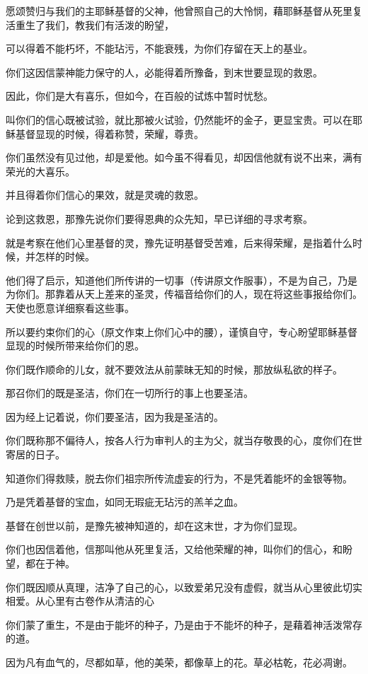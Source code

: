 \documentclass[12pt,oneside]{book}
\begin{document}
愿颂赞归与我们的主耶稣基督的父神，他曾照自己的大怜悯，藉耶稣基督从死里复活重生了我们，教我们有活泼的盼望，

可以得着不能朽坏，不能玷污，不能衰残，为你们存留在天上的基业。

你们这因信蒙神能力保守的人，必能得着所豫备，到末世要显现的救恩。

因此，你们是大有喜乐，但如今，在百般的试炼中暂时忧愁。

叫你们的信心既被试验，就比那被火试验，仍然能坏的金子，更显宝贵。可以在耶稣基督显现的时候，得着称赞，荣耀，尊贵。

你们虽然没有见过他，却是爱他。如今虽不得看见，却因信他就有说不出来，满有荣光的大喜乐。

并且得着你们信心的果效，就是灵魂的救恩。

论到这救恩，那豫先说你们要得恩典的众先知，早已详细的寻求考察。

就是考察在他们心里基督的灵，豫先证明基督受苦难，后来得荣耀，是指着什么时候，并怎样的时候。

他们得了启示，知道他们所传讲的一切事（传讲原文作服事），不是为自己，乃是为你们。那靠着从天上差来的圣灵，传福音给你们的人，现在将这些事报给你们。天使也愿意详细察看这些事。

所以要约束你们的心（原文作束上你们心中的腰），谨慎自守，专心盼望耶稣基督显现的时候所带来给你们的恩。

你们既作顺命的儿女，就不要效法从前蒙昧无知的时候，那放纵私欲的样子。

那召你们的既是圣洁，你们在一切所行的事上也要圣洁。

因为经上记着说，你们要圣洁，因为我是圣洁的。

你们既称那不偏待人，按各人行为审判人的主为父，就当存敬畏的心，度你们在世寄居的日子。

知道你们得救赎，脱去你们祖宗所传流虚妄的行为，不是凭着能坏的金银等物。

乃是凭着基督的宝血，如同无瑕疵无玷污的羔羊之血。

基督在创世以前，是豫先被神知道的，却在这末世，才为你们显现。

你们也因信着他，信那叫他从死里复活，又给他荣耀的神，叫你们的信心，和盼望，都在于神。

你们既因顺从真理，洁净了自己的心，以致爱弟兄没有虚假，就当从心里彼此切实相爱。从心里有古卷作从清洁的心

你们蒙了重生，不是由于能坏的种子，乃是由于不能坏的种子，是藉着神活泼常存的道。

因为凡有血气的，尽都如草，他的美荣，都像草上的花。草必枯乾，花必凋谢。
\end{document}
